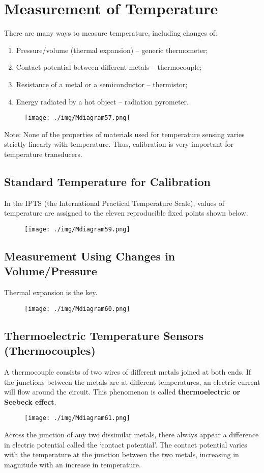 \chapter{Measurement of Temperature}
There are many ways to measure temperature, including changes of:
\begin{enumerate}
  \item Pressure/volume (thermal expansion) – generic thermometer;
  \item Contact potential between different metals – thermocouple;
  \item Resistance of a metal or a semiconductor – thermistor;
  \item Energy radiated by a hot object – radiation pyrometer.
\end{enumerate}
\begin{figure}[H]
  \centering
  \texttt{[image: ./img/Mdiagram57.png]}
\end{figure}
Note: None of the properties of materials used for temperature sensing varies strictly linearly with temperature. Thus, calibration is very important for temperature transducers.
\section{Standard Temperature for Calibration}
In the IPTS (the International Practical Temperature Scale), values of temperature are assigned to the eleven reproducible fixed points shown below.
\begin{figure}[H]
  \centering
  \texttt{[image: ./img/Mdiagram59.png]}
\end{figure}
\section{Measurement Using Changes in Volume/Pressure}
Thermal expansion is the key.
\begin{figure}[H]
  \centering
  \texttt{[image: ./img/Mdiagram60.png]}
\end{figure}
\section{Thermoelectric Temperature Sensors (Thermocouples)}
A thermocouple consists of two wires of different metals joined at both ends. If the junctions between the metals are at different temperatures, an electric current will flow around the circuit. This phenomenon is called \textbf{thermoelectric or Seebeck effect}.
\begin{figure}[H]
  \centering
  \texttt{[image: ./img/Mdiagram61.png]}
\end{figure}
Across the junction of any two dissimilar metals, there always appear a difference in electric potential called the ‘contact potential’. The contact potential varies with the temperature at the junction between the two metals, increasing in magnitude with an increase in temperature.
